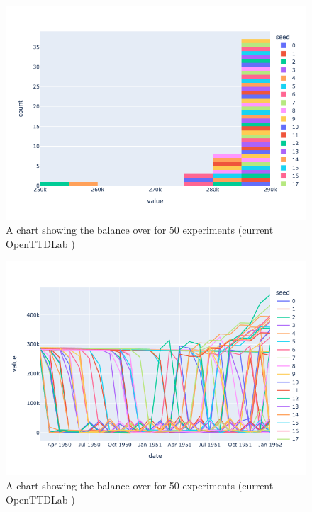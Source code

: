 \documentclass[logo,msc]{infthesis}           %
\begin{document}
\begin{figure}[h]
\centering
\includegraphics[width=\columnwidth]{assets/end-of-first-year-distribution.png}
\caption{A chart showing the balance over for 50 experiments (current OpenTTDLab )}
\label{fig:first-year}
\end{figure}

\begin{figure}[h]
\centering
\includegraphics[width=\columnwidth]{assets/first-2-years.png}
\caption{A chart showing the balance over for 50 experiments (current OpenTTDLab )}
\label{fig:first-year}
\end{figure}
\end{document}
